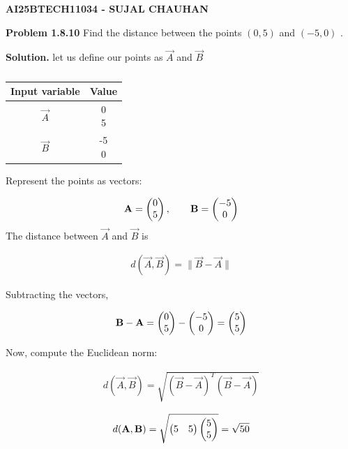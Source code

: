 \documentclass[12pt]{article}
\begin{document}
\begin{center}
    

\textbf{\Large AI25BTECH11034 - SUJAL CHAUHAN } 
\end{center}
\textbf{Problem 1.8.10}  
Find the distance between the points $(0,5)$ and $(-5,0)$ .



\textbf{Solution.}
let us define our points as $\vec{A} $ and $\vec{B}$
\begin{table}[H]
\centering
\begin{tabular}[12pt]{ |c| c|}
    \hline
    \textbf{Input variable} & \textbf{Value}\\ 
    \hline
    $\vec{A}$ & \myvec{0 \\5 } \\
    \hline 
    $\vec{B}$ & \myvec{-5 \\ 0}\\
    \hline
    \end{tabular}
    \caption{
    \label{}
    }
 \end{table}

Represent the points as vectors:

\begin{align}
 \mathbf{A}= \begin{pmatrix}0 \\ 5\end{pmatrix}, \qquad \mathbf{B} = \begin{pmatrix}-5 \\ 0 \end{pmatrix} 
\end{align}
The distance between $\vec{A}$ and $\vec{B}$ is


\begin{align}
d(\vec{A},\vec{B}) = \|\vec{B} - \vec{A}\| 
\end{align}

Subtracting the vectors,

\begin{align}
\mathbf{B} - \mathbf{A} = \begin{pmatrix}0 \\ 5 \end{pmatrix} - \begin{pmatrix}-5 \\ 0\end{pmatrix} = \begin{pmatrix}5 \\ 5\end{pmatrix}
\end{align}


Now, compute the Euclidean norm:

\begin{align}
d(\vec{A},\vec{B}) = \sqrt{(\vec{B}-\vec{A})^T(\vec{B}-\vec{A})}
\end{align}



\begin{align}
d(\mathbf{A},\mathbf{B}) = \sqrt{\begin{pmatrix}5 & 5 \end{pmatrix}\begin{pmatrix}5\\ 5\end{pmatrix}} = \sqrt{50}
\end{align}
\end{document}
